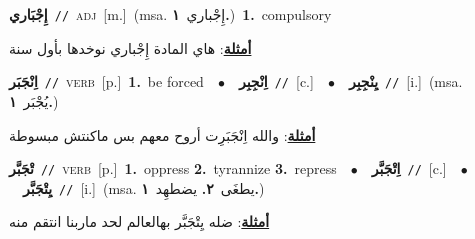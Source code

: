\documentclass[10pt,a4paper,twoside]{article} %
\begin{document}
\begin{multicols}{2}
{\setlength\topsep{0pt}\textbf{\foreignlanguage{arabic}{إِجْبَاري}}\ {\color{gray}\texttt{//}\color{black}}\ \textsc{adj}\ [m.]\ \color{gray}(msa. \foreignlanguage{arabic}{إِجْباري}~\foreignlanguage{arabic}{\textbf{١.}})\color{black}\ \textbf{1.}~compulsory\  \begin{flushright}\color{gray}\foreignlanguage{arabic}{\textbf{\underline{\foreignlanguage{arabic}{أمثلة}}}: هاي المادة إِجْباري نوخدها بأول سنة}\end{flushright}\color{black}} \vspace{2mm}

{\setlength\topsep{0pt}\textbf{\foreignlanguage{arabic}{اِنْجَبَر}}\ {\color{gray}\texttt{//}\color{black}}\ \textsc{verb}\ [p.]\ \textbf{1.}~be forced\ \ $\bullet$\ \ \setlength\topsep{0pt}\textbf{\foreignlanguage{arabic}{اِنْجِبِر}}\ {\color{gray}\texttt{//}\color{black}}\ [c.]\ \ $\bullet$\ \ \setlength\topsep{0pt}\textbf{\foreignlanguage{arabic}{يِنْجِبِر}}\ {\color{gray}\texttt{//}\color{black}}\ [i.]\ \color{gray}(msa. \foreignlanguage{arabic}{يُجْبَر}~\foreignlanguage{arabic}{\textbf{١.}})\color{black}\  \begin{flushright}\color{gray}\foreignlanguage{arabic}{\textbf{\underline{\foreignlanguage{arabic}{أمثلة}}}: والله اِنْجَبَرِت أروح معهم بس ماكنتش مبسوطة}\end{flushright}\color{black}} \vspace{2mm}

{\setlength\topsep{0pt}\textbf{\foreignlanguage{arabic}{تْجَبَّر}}\ {\color{gray}\texttt{//}\color{black}}\ \textsc{verb}\ [p.]\ \textbf{1.}~oppress  \textbf{2.}~tyrannize  \textbf{3.}~repress\ \ $\bullet$\ \ \setlength\topsep{0pt}\textbf{\foreignlanguage{arabic}{اِتْجَبَّر}}\ {\color{gray}\texttt{//}\color{black}}\ [c.]\ \ $\bullet$\ \ \setlength\topsep{0pt}\textbf{\foreignlanguage{arabic}{يِتْجَبَّر}}\ {\color{gray}\texttt{//}\color{black}}\ [i.]\ \color{gray}(msa. \foreignlanguage{arabic}{يطغَى}~\foreignlanguage{arabic}{\textbf{٢.}}  \foreignlanguage{arabic}{يضطهِد}~\foreignlanguage{arabic}{\textbf{١.}})\color{black}\  \begin{flushright}\color{gray}\foreignlanguage{arabic}{\textbf{\underline{\foreignlanguage{arabic}{أمثلة}}}: ضله يِتْجَبَّر بهالعالم لحد ماربنا انتقم منه}\end{flushright}\color{black}} \vspace{2mm}


\end{multicols}
\end{document}
